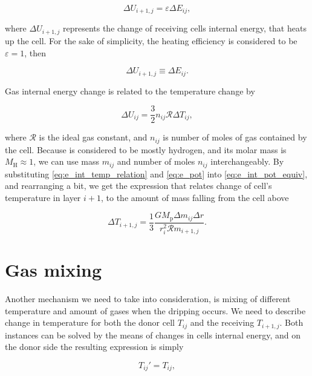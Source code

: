 \begin{equation}
	\Delta U_{i+1,j} = \varepsilon \Delta E_{ij},
\end{equation}

where $\Delta U_{i+1,j}$ represents the change of receiving cells internal energy, that heats up the cell. For the sake of simplicity, the heating efficiency is considered to be ${\varepsilon=1}$, then  

\begin{equation}
	\Delta U_{i+1,j} \equiv \Delta E_{ij}.
	\label{eq:e_int_pot_equiv}
\end{equation} 

Gas internal energy change is related to the temperature change by

\begin{equation}
	\Delta U_{ij} = \frac{3}{2} n_{ij} \mathcal{R} \Delta T_{ij},
	\label{eq:e_int_temp_relation}
\end{equation}

where $\mathcal{R}$ is the ideal gas constant, and $n_{ij}$ is number of moles of gas contained by the cell. Because is considered to be mostly hydrogen, and its molar mass is $M_{\text{H}} \approx 1$, we can use mass $m_{ij}$ and number of moles $n_{ij}$ interchangeably. By substituting \eqref{eq:e_int_temp_relation} and \eqref{eq:e_pot} into \eqref{eq:e_int_pot_equiv}, and rearranging a bit, we get the expression that relates change of cell's temperature in layer $i+1$, to the amount of mass falling from the cell above

\begin{equation}
	\Delta T_{i+1,j} = \frac{1}{3} \frac{G M_{\text{p}} \Delta m_{ij} \Delta r}{r_{i}^2 \mathcal{R} m_{i+1,j}}.
	\label{eq:temp_ff_final}
\end{equation}

\section{Gas mixing}

Another mechanism we need to take into consideration, is mixing of different temperature and amount of gases when the dripping occurs. We need to describe change in temperature for both the donor cell $T_{ij}$ and the receiving $T_{i+1,j}$. Both instances can be solved by the means of changes in cells internal energy, and on the donor side the resulting expression is simply  

\begin{equation}
T_{ij}' = T_{ij},
\end{equation}

